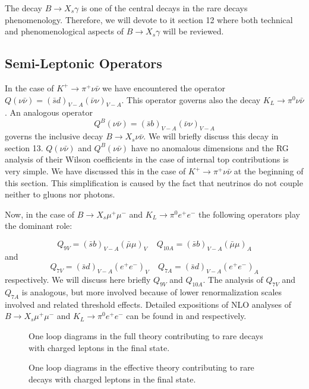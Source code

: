 \documentclass[12pt,rotate]{article}
\newcommand{\be}{\begin{equation}}
\newcommand{\ee}{\end{equation}}
\def\kpn{K^+\rightarrow\pi^+\nu\bar\nu}
\begin{document}
\begin{itemize}
\begin{itemize}
The decay $B\to X_s\gamma$ is one of the central decays in the
rare decays phenomenology.
Therefore, we will devote to it  section 12 where both
technical and phenomenological aspects of $B\to X_s\gamma$ will be
reviewed.
\subsection{Semi-Leptonic Operators}
In the case of $\kpn$ we have encountered the operator
$Q(\nu\bar\nu)=(\bar sd)_{V-A}(\bar\nu\nu)_{V-A}$. This operator
governs also the decay $K_L\to\pi^0\nu\bar\nu$. An analogous operator 
\be
Q^B(\nu\bar\nu)=(\bar sb)_{V-A}(\bar\nu\nu)_{V-A}
\ee
governs the inclusive decay $B\to X_s\nu\bar\nu$. We will briefly discuss
this decay in section 13.
$Q(\nu\bar\nu)$ and $Q^B(\nu\bar\nu)$ have no anomalous dimensions and
the RG analysis of their Wilson coefficients in the case of internal top
contributions is very simple. We have
discussed this in the case of $\kpn$ at the beginning of this section.
This simplification is caused by the fact that neutrinos do not couple
neither to gluons nor photons. 

Now, in the case of $B \to X_s \mu^+\mu^-$ and $K_L\to \pi^0 e^+e^-$
the following operators play the dominant role:

\begin{equation}\label{9V}
Q_{9V}  = (\bar s b  )_{V-A} (\bar \mu\mu)_{V}~~~~~
Q_{10A}  = (\bar s b )_{V-A} (\bar \mu\mu)_{A}
\end{equation}
and
\be\label{9VS}
Q_{7V}  = (\bar s d  )_{V-A} (e^+e^-)_{V}~~~~~
Q_{7A}  = (\bar s d )_{V-A} (e^+e^-)_{A}
\end{equation}
respectively. We will discuss here briefly $Q_{9V}$ and $Q_{10A}$. The
analysis of $Q_{7V}$ and $Q_{7A}$ is analogous, but more involved
because of lower
renormalization scales involved and related threshold effects.
Detailed expositions of NLO analyses of 
$B \to X_s \mu^+\mu^-$ and $K_L\to \pi^0 e^+e^-$ can be found in
\cite{Mis:94,BuMu:94}  and \cite{BLMM} respectively.

\begin{figure}[hbt]
\vspace{0.10in}
\centerline{
\epsfysize=1.5in
}%
\vspace{0.08in}
\caption[]{One loop diagrams in the full theory contributing to rare decays
with charged leptons in the final state.
\label{L:17}}
\end{figure}

\begin{figure}[hbt]
\vspace{0.10in}
\centerline{
\epsfysize=1.5in
}%
\vspace{0.08in}
\caption[]{One loop diagrams in the effective theory contributing to 
rare decays with charged leptons in the final state.
\label{L:18}}
\end{figure}


\end{itemize}
\end{itemize}
\end{document}
